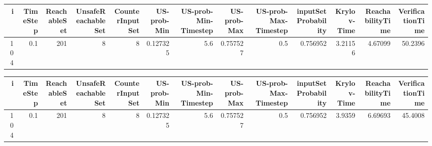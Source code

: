 \begin{tabular}{rrrrrrrrrrrrr}
\hline
   i &   TimeStep &   ReachableSet &   UnsafeReachableSet &   CounterInputSet &   US-prob-Min &   US-prob-Min-Timestep &   US-prob-Max &   US-prob-Max-Timestep &   inputSet Probability &   Krylov-Time &   ReachabilityTime &   VerificationTime \\
\hline
 104 &        0.1 &            201 &                    8 &                 8 &      0.127325 &                    5.6 &      0.757527 &                    0.5 &               0.756952 &       3.21156 &            4.67099 &            50.2396 \\
\hline
\end{tabular}
\begin{tabular}{rrrrrrrrrrrrr}
\hline
   i &   TimeStep &   ReachableSet &   UnsafeReachableSet &   CounterInputSet &   US-prob-Min &   US-prob-Min-Timestep &   US-prob-Max &   US-prob-Max-Timestep &   inputSet Probability &   Krylov-Time &   ReachabilityTime &   VerificationTime \\
\hline
 104 &        0.1 &            201 &                    8 &                 8 &      0.127325 &                    5.6 &      0.757527 &                    0.5 &               0.756952 &        3.9359 &            6.69693 &            45.4008 \\
\hline
\end{tabular}
